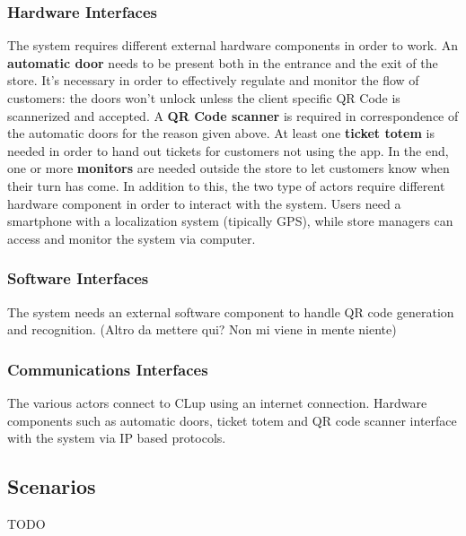 \documentclass[]{article}
\begin{document}
			\subsubsection{Hardware Interfaces}
			The system requires different external hardware components in order to work. \newline
			An \textbf{automatic door} needs to be present both in the entrance and the exit of the store. It's necessary in order to effectively regulate and monitor the flow of customers: the doors won't unlock unless the client specific QR Code is scannerized and accepted. \newline
			A \textbf{QR Code scanner} is required in correspondence of the automatic doors for the reason given above. \newline
			At least one \textbf{ticket totem} is needed in order to hand out tickets for customers not using the app. \newline
			In the end, one or more \textbf{monitors} are needed outside the store to let customers know when their turn has come. \newline \newline
			In addition to this, the  two type of actors require different hardware component in order to interact with the system. \newline
			Users need a smartphone with a localization system (tipically GPS), while store managers can access and monitor the system via computer.
			\subsubsection{Software Interfaces}
			The system needs an external software component to handle QR code generation and recognition. \newline (Altro da mettere qui? Non mi viene in mente niente)
			\subsubsection{Communications Interfaces}
			The various actors connect to CLup using an internet connection. \newline
			Hardware components such as automatic doors, ticket totem and QR code scanner interface with the system via IP based protocols.
		\subsection{Scenarios}
		
		TODO
		
\end{document}
